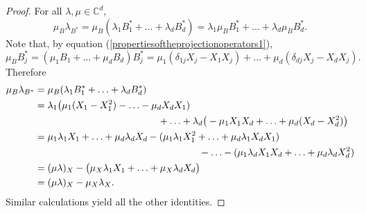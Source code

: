 \documentclass[11pt, reqno]{amsart}
\newcommand\1{\boldsymbol {1}}
\numberwithin{equation}{section}
\begin{document}
\begin{proof}
For all $\lambda, \mu \in\mathbb{C}^{d}$, 
$$\mu_{B}\lambda_{B^{*}} = \mu_{B}(\lambda_{1}B^{*}_{1} + \hdots + \lambda_{d}B^{*}_{d})  = \lambda_{1}\mu_{B}B^{*}_{1}+\hdots+\lambda_{d}\mu_{B}B_{d}^{*}.$$
Note that, by equation (\ref{propertiesoftheprojectionoperators1}), 
\begin{equation}\label{mubequation}
\mu_{B}B^{*}_{j} = (\mu_{1}B_{1}+\hdots + \mu_{d}B_{d})B_{j}^{*} = \mu_{1}( \delta_{1j}X_{j}-X_{1}X_{j})+\hdots+\mu_{d}( \delta_{dj}X_{j}-X_{d}X_{j}).
\end{equation}
Therefore
\begin{align*}
\mu_{B}\lambda_{B^{*}}
&= \mu_{B}(\lambda_{1}B_{1}^{*}+\hdots+\lambda_{d}B^{*}_{d})  \\	
&= \lambda_{1}\big(\mu_{1}(X_{1}-X^{2}_{1})- \hdots - \mu_{d}X_{d}X_{1})\\
&\hspace{4.5cm}+\hdots+\lambda_{d}\big(-\mu_{1}X_{1}X_{d}+\hdots+\mu_{d}(X_{d}-X^{2}_{d})\big) \\
& = \mu_{1}\lambda_{1}X_{1}+\hdots +\mu_{d}\lambda_{d}X_{d}-(\mu_{1}\lambda_{1}X^{2}_{1}+\hdots+\mu_{d}\lambda_{1}X_{d}X_{1})\\
&\hspace{6cm}-\hdots-(\mu_{1}\lambda_{d}X_{1}X_{d}+\hdots+\mu_{d}\lambda_{d}X_{d}^{2}) \\
& = (\mu\lambda)_{X} - \big(\mu_{X}\lambda_{1}X_{1}+\hdots+\mu_{X}\lambda_{d}X_{d}\big) \\
&= (\mu\lambda)_{X}-\mu_{X}\lambda_{X}.
\end{align*}
Similar calculations yield all the other identities.\end{proof}
\end{document}

